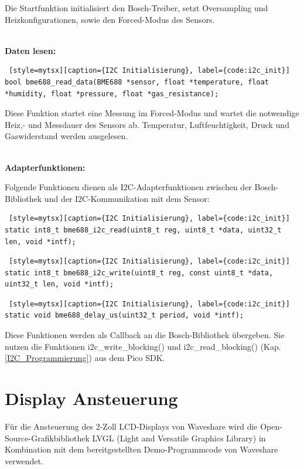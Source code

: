 \begin{inhalt}
Die Startfunktion initialisiert den Bosch-Treiber, setzt Oversampling und Heizkonfigurationen, sowie den Forced-Modus des Sensors. 

\bigskip \\
\textbf{Daten lesen:}

\begin{lstlisting} [style=mytsx][caption={I2C Initialisierung}, label={code:i2c_init}]
bool bme688_read_data(BME688 *sensor, float *temperature, float *humidity, float *pressure, float *gas_resistance);
\end{lstlisting}

Diese Funktion startet eine Messung im Forced-Modus und wartet die notwendige Heiz,- und Messdauer des Sensors ab. Temperatur, Luftfeuchtigkeit, Druck und Gaswiderstand werden ausgelesen. 

\bigskip \\
\textbf{Adapterfunktionen:}

Folgende Funktionen dienen als I2C-Adapterfunktionen zwischen der Bosch-Bibliothek und der I2C-Kommunikation mit dem Sensor:

\begin{lstlisting} [style=mytsx][caption={I2C Initialisierung}, label={code:i2c_init}]
static int8_t bme688_i2c_read(uint8_t reg, uint8_t *data, uint32_t len, void *intf);
\end{lstlisting}

\begin{lstlisting} [style=mytsx][caption={I2C Initialisierung}, label={code:i2c_init}]
static int8_t bme688_i2c_write(uint8_t reg, const uint8_t *data, uint32_t len, void *intf);
\end{lstlisting}

\begin{lstlisting} [style=mytsx][caption={I2C Initialisierung}, label={code:i2c_init}]
static void bme688_delay_us(uint32_t period, void *intf);
\end{lstlisting}

Diese Funktionen werden als Callback an die Bosch-Bibliothek übergeben. Sie nutzen die Funktionen i2c\_write\_blocking() und i2c\_read\_blocking() (Kap. \ref{I2C_Programmierung}) aus dem Pico SDK.


\section{Display Ansteuerung}

Für die Ansteuerung des 2-Zoll LCD-Displays von Waveshare wird die Open-Source-Grafikbibliothek LVGL (Light and Versatile Graphics Library) in Kombination mit dem bereitgestellten Demo-Programmcode von Waveshare verwendet. 


\end{inhalt}
